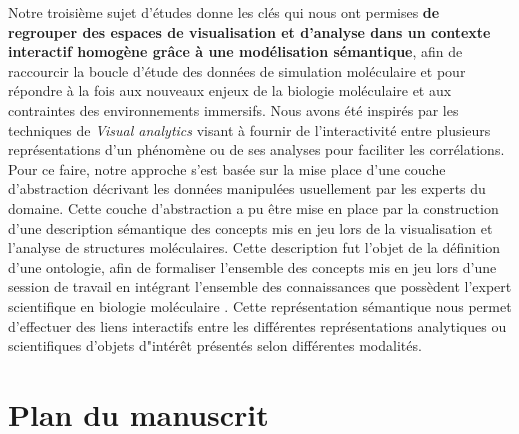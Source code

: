 Notre troisième sujet d'études donne les clés qui nous ont permises \textbf{de regrouper des espaces de visualisation et d'analyse dans un contexte interactif homogène grâce à une modélisation sémantique}, afin de raccourcir la boucle d'étude des données de simulation moléculaire et pour répondre à la fois aux nouveaux enjeux de la biologie moléculaire et aux contraintes des environnements immersifs. %
Nous avons été inspirés par les techniques de \textit{Visual analytics} visant à fournir de  l'interactivité entre plusieurs représentations d'un phénomène ou de ses analyses pour faciliter les corrélations\cite{kielman2009foundations}.
Pour ce faire, notre approche s'est basée sur la mise place d'une couche d'abstraction décrivant les données manipulées usuellement par les experts du domaine. Cette couche d'abstraction a pu être mise en place par la construction d'une description sémantique des concepts mis en jeu lors de la visualisation et l'analyse de structures moléculaires. Cette description fut l'objet de la définition d'une ontologie, afin de formaliser l'ensemble des concepts mis en jeu lors d'une session de travail en intégrant l'ensemble des connaissances que possèdent l'expert scientifique en biologie moléculaire \cite{berners2001semantic}. Cette représentation sémantique nous permet d'effectuer des liens interactifs entre les différentes représentations analytiques ou scientifiques d'objets d"intérêt présentés selon différentes modalités.



\section*{Plan du manuscrit}

